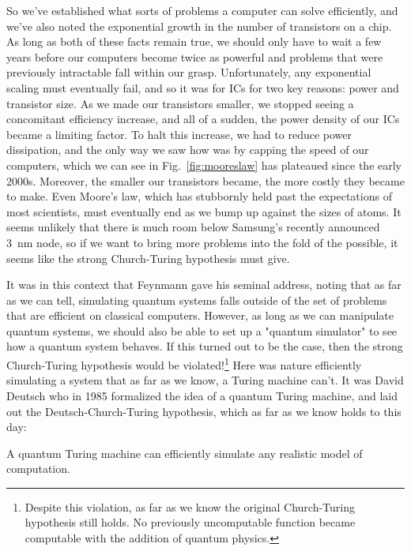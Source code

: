 So we've established what sorts of problems a computer can solve efficiently, and we've also noted the
exponential growth in the number of transistors on a chip. As long as both of these facts remain true, we
should only have to wait a few years before our computers become twice as powerful and problems that were
previously intractable fall within our grasp. Unfortunately, any exponential scaling must eventually fail,
and so it was for ICs for two key reasons: power and transistor size. As we made our transistors smaller,
we stopped seeing a concomitant efficiency increase, and all of a sudden, the power density of our ICs
became a limiting factor. To halt this increase, we had to reduce power dissipation, and the
only way we saw how was by capping the speed of our computers, which we can see in Fig.~\ref{fig:mooreslaw}
has plateaued since the early 2000s. Moreover, the smaller our transistors became, the more costly they became
to make. Even Moore's law, which has stubbornly held past the expectations of most scientists, must eventually
end as we bump up against the sizes of atoms. It seems unlikely that there is much room below Samsung's
recently announced \SI{3}{\nano\meter} node, so if we want to bring more problems into the fold of the
possible, it seems like the strong Church-Turing hypothesis must give.

It was in this context that Feynmann gave his seminal address, noting that as far as we can tell, simulating
quantum systems falls outside of the set of problems that are efficient on classical computers\cite{Feynman1982}.
However, as long as we can manipulate quantum systems, we should also be able to set up a "quantum
simulator" to see how a quantum system behaves. If this turned out to be the case, then the strong
Church-Turing hypothesis would be violated!\footnote{Despite this violation, as far as we know the original
Church-Turing hypothesis still holds. No previously uncomputable function became computable with the addition
of quantum physics.} Here was nature efficiently simulating a system that as far as we know, a Turing machine
can't. It was David Deutsch who in 1985 formalized the idea of a quantum Turing machine\cite{doi:10.1098/rspa.1985.0070},
and laid out the Deutsch-Church-Turing hypothesis, which as far as we know holds to this day:

\begin{displayquote}
  A quantum Turing machine can efficiently simulate any realistic model of computation.
\end{displayquote}

